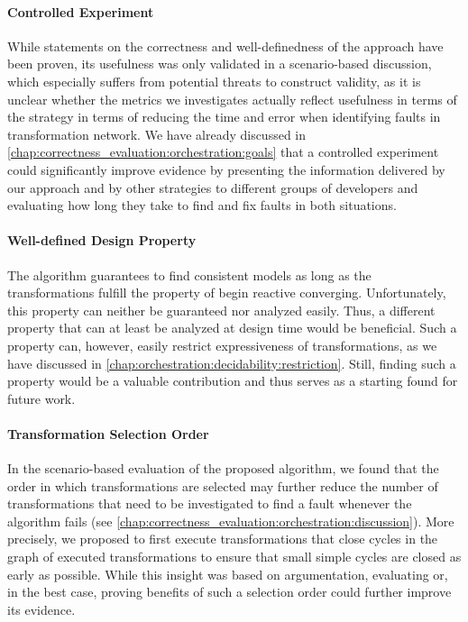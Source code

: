 \paragraph{Controlled Experiment}
\label{chap:futurework:correctness:orchestration:experiment}
While statements on the correctness and well-definedness of the approach have been proven, its usefulness was only validated in a scenario-based discussion, which especially suffers from potential threats to construct validity, as it is unclear whether the metrics we investigates actually reflect usefulness in terms of the strategy in terms of reducing the time and error when identifying faults in transformation network.
We have already discussed in \autoref{chap:correctness_evaluation:orchestration:goals} that a controlled experiment could significantly improve evidence by presenting the information delivered by our approach and by other strategies to different groups of developers and evaluating how long they take to find and fix faults in both situations.

\paragraph{Well-defined Design Property}
\label{chap:futurework:correctness:orchestration:property}
The algorithm guarantees to find consistent models as long as the transformations fulfill the property of begin reactive converging.
Unfortunately, this property can neither be guaranteed nor analyzed easily.
Thus, a different property that can at least be analyzed at design time would be beneficial.
Such a property can, however, easily restrict expressiveness of transformations, as we have discussed in \autoref{chap:orchestration:decidability:restriction}.
Still, finding such a property would be a valuable contribution and thus serves as a starting found for future work.

\paragraph{Transformation Selection Order}
\label{chap:futurework:correctness:orchestration:selection}
In the scenario-based evaluation of the proposed algorithm, we found that the order in which transformations are selected may further reduce the number of transformations that need to be investigated to find a fault whenever the algorithm fails (see \autoref{chap:correctness_evaluation:orchestration:discussion}).
More precisely, we proposed to first execute transformations that close cycles in the graph of executed transformations to ensure that small simple cycles are closed as early as possible.
While this insight was based on argumentation, evaluating or, in the best case, proving benefits of such a selection order could further improve its evidence.

